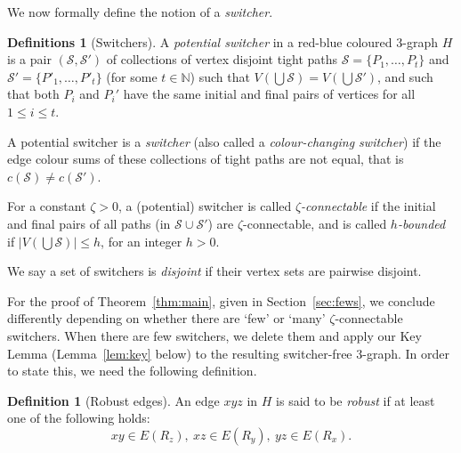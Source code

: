 \documentclass[A4paper,12pt]{article}
\theoremstyle{definition}
\newtheorem{define}[thm]{Definition}
\newtheorem{defs}[thm]{Definitions}
\begin{document}
We now formally define the notion of a \emph{switcher}.

\begin{defs}[Switchers]
A \emph{potential switcher} in a red-blue coloured $3$-graph $H$ is a pair $(\mathcal{S}, \mathcal{S}')$ of collections of vertex disjoint tight paths $\mathcal{S} = \{P_1,\ldots,P_t\}$ and $\mathcal{S}' = \{P'_1,\ldots,P'_t\}$  (for some $t \in \mathbb{N}$) such that $V(\bigcup \mathcal{S}) = V(\bigcup \mathcal{S}')$, and such that both $P_i$ and  $P_i'$ have the same initial and final pairs of vertices for all $1 \le i \le t$.

A potential switcher is a \emph{switcher} (also called a \emph{colour-changing switcher}) if the edge colour sums of these collections of tight paths are not equal, that is $c(\mathcal{S}) \ne c(\mathcal{S}')$.

For a constant $\zeta > 0$, a (potential) switcher is called \emph{$\zeta$-connectable} if the initial and final pairs of all paths (in $\mathcal{S} \cup \mathcal{S}'$) are $\zeta$-connectable, and is called \emph{$h$-bounded} if $|V(\bigcup \mathcal{S})| \leq h$, for an integer $h > 0$. 

We say a set of switchers is \emph{disjoint} if their vertex sets are pairwise disjoint. 
\end{defs}

\bigskip

For the proof of Theorem~\ref{thm:main}, given in Section~\ref{sec:fews}, we conclude differently depending on whether there are `few' or `many' $\zeta$-connectable switchers. When there are few switchers, we delete them and apply our Key Lemma (Lemma~\ref{lem:key} below) to the resulting switcher-free 3-graph. In order to state this, we need the following definition.

\begin{define}[Robust edges]
    An edge $xyz$ in $H$ is said to be \emph{robust} if at least one of the following holds: $$xy \in E(R_z), \ xz \in E(R_y), \ yz \in E(R_x).$$ 
\end{define}
\end{document}
